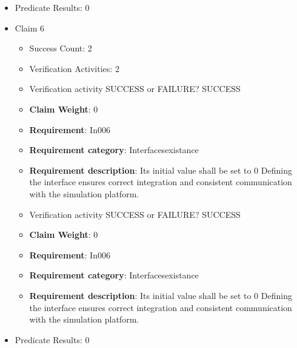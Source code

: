 \documentclass{article}
\begin{document}
\begin{itemize}
\begin{itemize}
					\item Verification activity SUCCESS or FAILURE? SUCCESS
					\item \textbf{Claim Weight}: 0
						\item \textbf{Requirement}: In005 
						\item \textbf{Requirement category}: Interfacesexistance 
						\item \textbf{Requirement description}: Its initial value shall be set to 0 Defining the interface ensures correct integration and consistent communication with the simulation platform.
					
				\end{itemize}
				
									    
				\item Predicate Results: 0

  				  \item Claim 6
				\begin{itemize}
			    	\item Success Count: 2 
			    	\item Verification Activities: 2
					\item Verification activity SUCCESS or FAILURE? SUCCESS
					\item \textbf{Claim Weight}: 0
						\item \textbf{Requirement}: In006 
						\item \textbf{Requirement category}: Interfacesexistance 
						\item \textbf{Requirement description}: Its initial value shall be set to 0 Defining the interface ensures correct integration and consistent communication with the simulation platform.
					
					\item Verification activity SUCCESS or FAILURE? SUCCESS
					\item \textbf{Claim Weight}: 0
						\item \textbf{Requirement}: In006 
						\item \textbf{Requirement category}: Interfacesexistance 
						\item \textbf{Requirement description}: Its initial value shall be set to 0 Defining the interface ensures correct integration and consistent communication with the simulation platform.
					
				\end{itemize}
				
									    
				\item Predicate Results: 0


\end{itemize}
\end{document}
